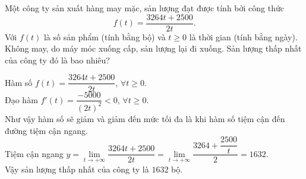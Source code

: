 \begin{bt}%

	Một công ty sản xuất hàng may mặc, sản lượng đạt được tính bởi công thức $$f(t)=\dfrac{3264t + 2500}{2t}.$$
	Với $f(t)$ là số sản phẩm (tính bằng bộ) và $t\ge 0$ là thời gian (tính bằng ngày).
	Không may, do máy móc xuống cấp, sản lượng lại đi xuống. Sản lượng thấp nhất của công ty đó là bao nhiêu?
	
	\loigiai
	{
		Hàm số $f(t) = \dfrac{3264t + 2500}{2t}$, $\forall t \ge 0$.\\
		Đạo hàm $f'(t) = \dfrac{-5000}{(2t)^2}<0$, $\forall t \ge 0$.\\
		Như vậy hàm số sẽ giảm và giảm đến mức tối đa là khi hàm số tiệm cận đến đường tiệm cận ngang.\\
		Tiệm cận ngang $y=\lim\limits_{t \to +\infty} \dfrac{3264t + 2500}{2t} =\lim\limits_{t \to +\infty} \dfrac{3264 + \dfrac{2500}{t}}{2} = 1632$.\\
		Vậy sản lượng thấp nhất của công ty là $1632$ bộ.
	}
\end{bt}

